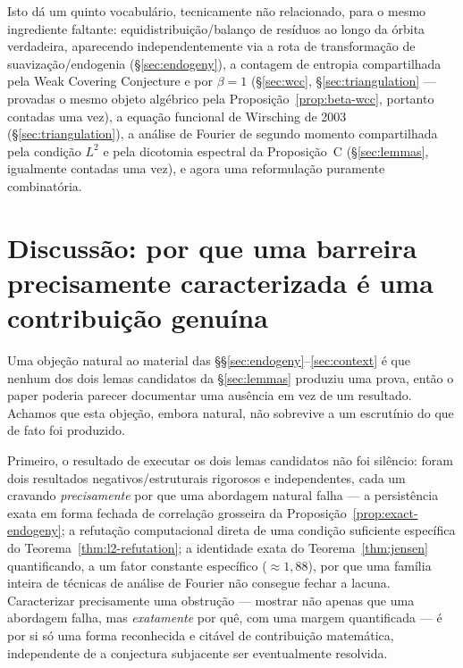 \documentclass[11pt]{article}
\theoremstyle{definition}
\theoremstyle{remark}
\begin{document}
Isto dá um quinto vocabulário, tecnicamente não relacionado, para o
mesmo ingrediente faltante: equidistribuição/balanço de resíduos ao
longo da órbita verdadeira, aparecendo independentemente via a rota de
transformação de suavização/endogenia (\S\ref{sec:endogeny}), a
contagem de entropia compartilhada pela Weak Covering Conjecture e por
$\beta=1$ (\S\ref{sec:wcc}, \S\ref{sec:triangulation} --- provadas o
mesmo objeto algébrico pela Proposição~\ref{prop:beta-wcc}, portanto
contadas uma vez), a equação funcional de Wirsching de 2003
(\S\ref{sec:triangulation}), a análise de Fourier de segundo momento
compartilhada pela condição $L^2$ e pela dicotomia espectral da
Proposição~C (\S\ref{sec:lemmas}, igualmente contadas uma vez), e agora
uma reformulação puramente combinatória.

\section{Discussão: por que uma barreira precisamente caracterizada é
uma contribuição genuína}
\label{sec:discussion}

Uma objeção natural ao material das \S\S\ref{sec:endogeny}--\ref{sec:context}
é que nenhum dos dois lemas candidatos da \S\ref{sec:lemmas} produziu
uma prova, então o paper poderia parecer documentar uma ausência em
vez de um resultado. Achamos que esta objeção, embora natural, não
sobrevive a um escrutínio do que de fato foi produzido.

Primeiro, o resultado de executar os dois lemas candidatos não foi
silêncio: foram dois resultados negativos/estruturais rigorosos e
independentes, cada um cravando \emph{precisamente} por que uma
abordagem natural falha --- a persistência exata em forma fechada de
correlação grosseira da Proposição~\ref{prop:exact-endogeny}; a
refutação computacional direta de uma condição suficiente específica
do Teorema~\ref{thm:l2-refutation}; a identidade exata do
Teorema~\ref{thm:jensen} quantificando, a um fator constante específico
($\approx1{,}88$), por que uma família inteira de técnicas de análise
de Fourier não consegue fechar a lacuna. Caracterizar precisamente uma
obstrução --- mostrar não apenas que uma abordagem falha, mas
\emph{exatamente} por quê, com uma margem quantificada --- é por si só
uma forma reconhecida e citável de contribuição matemática,
independente de a conjectura subjacente ser eventualmente resolvida.
\end{document}
